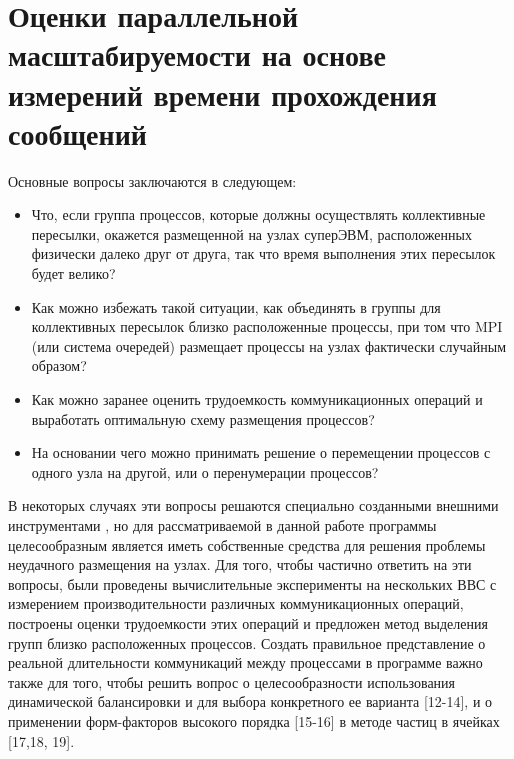 		
        \section{Оценки параллельной масштабируемости на основе измерений времени прохождения сообщений}
        
        Основные вопросы заключаются в следующем:
        \begin{itemize} 
        \item Что, если группа процессов, которые должны осуществлять коллективные пересылки, окажется размещенной на узлах суперЭВМ, расположенных физически далеко друг от друга, так что время выполнения этих пересылок будет велико?
        \item Как можно избежать такой ситуации, как объединять в группы для коллективных пересылок близко расположенные процессы, при том что MPI (или система очередей) размещает процессы на узлах фактически случайным образом? 
        \item Как можно заранее оценить трудоемкость коммуникационных операций и выработать оптимальную схему размещения процессов? 
        \item На основании чего можно принимать решение о перемещении процессов с одного узла на другой, или о перенумерации процессов?
        \end{itemize} 
        В некоторых случаях эти вопросы решаются специально созданными внешними инструментами , но для рассматриваемой в данной работе программы целесообразным является иметь собственные средства для решения проблемы неудачного размещения на узлах.
        Для того, чтобы частично ответить на эти вопросы, были проведены вычислительные эксперименты на нескольких ВВС с измерением производительности различных коммуникационных операций, построены оценки трудоемкости этих операций и предложен метод выделения групп близко расположенных процессов. Создать правильное представление о реальной длительности коммуникаций между процессами в программе важно также для того, чтобы решить вопрос о целесообразности использования динамической балансировки и для выбора конкретного ее варианта [12-14], и о применении форм-факторов высокого порядка [15-16] в методе частиц в ячейках [17,18, 19]. 
        
